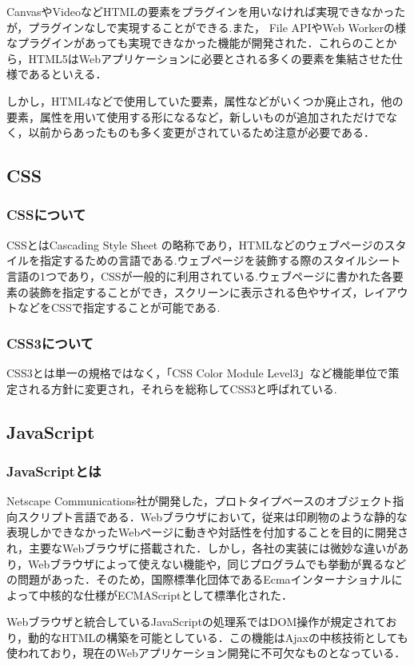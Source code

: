 \documentclass[a4j,12pt]{jarticle}
\begin{document}
CanvasやVideoなどHTMLの要素をプラグインを用いなければ実現できなかったが，プラグインなしで実現することができる.また，
File APIやWeb Workerの様なプラグインがあっても実現できなかった機能が開発された．これらのことから，HTML5はWebアプリケーションに必要とされる多くの要素を集結させた仕様であるといえる．

しかし，HTML4などで使用していた要素，属性などがいくつか廃止され，他の要素，属性を用いて使用する形になるなど，新しいものが追加されただけでなく，以前からあったものも多く変更がされているため注意が必要である\cite{ren8}．
\newpage
\subsection{CSS}
\subsubsection{CSSについて}
CSSとはCascading Style Sheet の略称であり，HTMLなどのウェブページのスタイルを指定するための言語である.ウェブページを装飾する際のスタイルシート言語の1つであり，CSSが一般的に利用されている.ウェブページに書かれた各要素の装飾を指定することができ，スクリーンに表示される色やサイズ，レイアウトなどをCSSで指定することが可能である.
\subsubsection{CSS3について}
CSS3とは単一の規格ではなく，「CSS Color Module Level3」など機能単位で策定される方針に変更され，それらを総称してCSS3と呼ばれている.
\subsection{JavaScript}
\subsubsection{JavaScriptとは}
Netscape Communications社が開発した，プロトタイプベースのオブジェクト指向スクリプト言語である．Webブラウザにおいて，従来は印刷物のような静的な表現しかできなかったWebページに動きや対話性を付加することを目的に開発され，主要なWebブラウザに搭載された．しかし，各社の実装には微妙な違いがあり，Webブラウザによって使えない機能や，同じプログラムでも挙動が異るなどの問題があった．そのため，国際標準化団体であるEcmaインターナショナルによって中核的な仕様がECMAScriptとして標準化された．

Webブラウザと統合しているJavaScriptの処理系ではDOM操作が規定されており，動的なHTMLの構築を可能としている．この機能はAjaxの中核技術としても使われており，現在のWebアプリケーション開発に不可欠なものとなっている．
\end{document}
